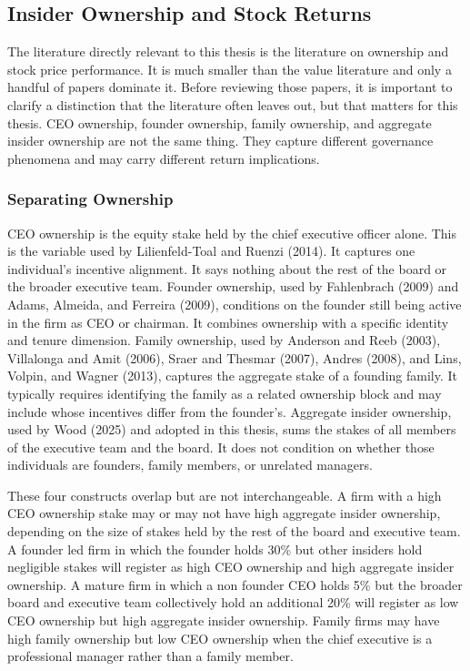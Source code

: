 \subsection{Insider Ownership and Stock Returns}

The literature directly relevant to this thesis is the literature on ownership and stock price performance. It is much smaller than the value literature and only a handful of papers dominate it. Before reviewing those papers, it is important to clarify a distinction that the literature often leaves out, but that matters for this thesis. CEO ownership, founder ownership, family ownership, and aggregate insider ownership are not the same thing. They capture different governance phenomena and may carry different return implications.


\subsubsection{Separating Ownership}

CEO ownership is the equity stake held by the chief executive officer alone. This is the variable used by Lilienfeld-Toal and Ruenzi (2014). It captures one individual's incentive alignment. It says nothing about the rest of the board or the broader executive team. Founder ownership, used by Fahlenbrach (2009) and Adams, Almeida, and Ferreira (2009), conditions on the founder still being active in the firm as CEO or chairman. It combines ownership with a specific identity and tenure dimension. Family ownership, used by Anderson and Reeb (2003), Villalonga and Amit (2006), Sraer and Thesmar (2007), Andres (2008), and Lins, Volpin, and Wagner (2013), captures the aggregate stake of a founding family. It typically requires identifying the family as a related ownership block and may include whose incentives differ from the founder's. Aggregate insider ownership, used by Wood (2025) and adopted in this thesis, sums the stakes of all members of the executive team and the board. It does not condition on whether those individuals are founders, family members, or unrelated managers.

These four constructs overlap but are not interchangeable. A firm with a high CEO ownership stake may or may not have high aggregate insider ownership, depending on the size of stakes held by the rest of the board and executive team. A founder led firm in which the founder holds 30\% but other insiders hold negligible stakes will register as high CEO ownership and high aggregate insider ownership. A mature firm in which a non founder CEO holds 5\% but the broader board and executive team collectively hold an additional 20\% will register as low CEO ownership but high aggregate insider ownership. Family firms may have high family ownership but low CEO ownership when the chief executive is a professional manager rather than a family member.

